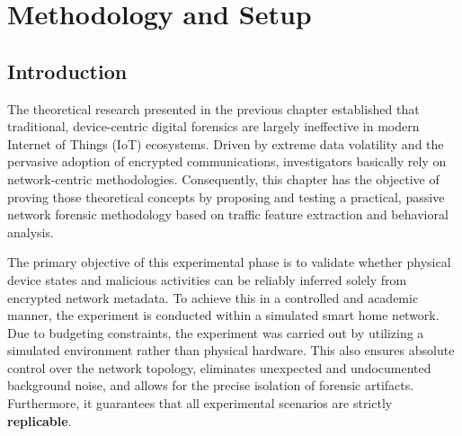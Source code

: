 \section{Methodology and Setup}

\subsection{Introduction}
The theoretical research presented in the previous chapter established that traditional, device-centric digital forensics are largely ineffective in modern Internet of Things (IoT) ecosystems. Driven by extreme data volatility and the pervasive adoption of encrypted communications, investigators basically rely on network-centric methodologies. Consequently, this chapter has the objective of proving those theoretical concepts by proposing and testing a practical, passive network forensic methodology based on traffic feature extraction and behavioral analysis.

The primary objective of this experimental phase is to validate whether physical device states and malicious activities can be reliably inferred solely from encrypted network metadata. To achieve this in a controlled and academic manner, the experiment is conducted within a simulated smart home network. Due to budgeting constraints, the experiment was carried out by utilizing a simulated environment rather than physical hardware. This also ensures absolute control over the network topology, eliminates unexpected and undocumented background noise, and allows for the precise isolation of forensic artifacts. Furthermore, it guarantees that all experimental scenarios are strictly \textbf{replicable}.

